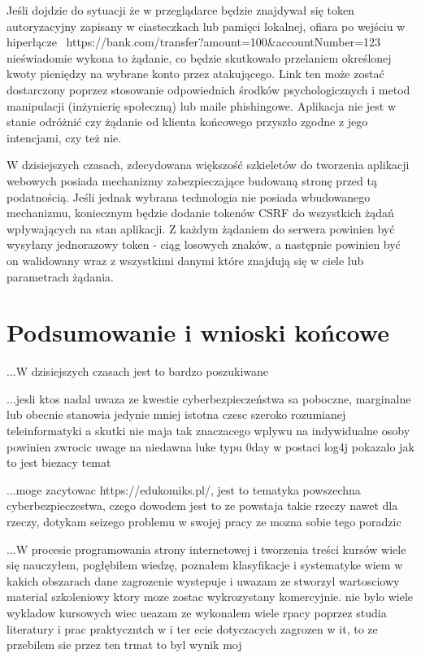 \documentclass[12pt,twoside]{article}
\begin{document}
{Jeśli dojdzie do sytuacji że w przeglądarce będzie znajdywał się token autoryzacyjny zapisany w ciasteczkach lub pamięci lokalnej, ofiara po wejściu  w hiperłącze \
{https://bank.com/transfer?amount=100\&accountNumber=123} nieświadomie wykona to żądanie, co będzie skutkowało przelaniem określonej kwoty pieniędzy na wybrane konto przez atakującego. Link ten może zostać dostarczony poprzez stosowanie odpowiednich środków psychologicznych i metod manipulacji (inżynierię społeczną) lub maile phishingowe. Aplikacja nie jest w stanie odróżnić czy żądanie od klienta końcowego przyszło zgodne z jego intencjami, czy też nie. 

W dzisiejszych czasach, zdecydowana większość szkieletów do tworzenia aplikacji webowych posiada mechanizmy zabezpieczające budowaną stronę przed tą podatnością. Jeśli jednak wybrana technologia nie posiada wbudowanego mechanizmu, koniecznym będzie dodanie tokenów CSRF do wszystkich żądań wpływających na stan aplikacji. Z każdym żądaniem do serwera powinien być wysyłany jednorazowy token - ciąg losowych znaków, a następnie powinien być on walidowany wraz z wszystkimi danymi które znajdują się w ciele lub parametrach żądania. 


\clearpage

\section{Podsumowanie i wnioski końcowe}

...W dzisiejszych czasach jest to bardzo poszukiwane

...jesli ktos nadal uwaza ze kwestie cyberbezpieczeństwa sa poboczne, marginalne lub obecnie stanowia jedynie mniej istotna czesc szeroko rozumianej teleinformatyki a skutki nie maja tak znaczacego wplywu na indywidualne osoby powinien zwrocic uwage na niedawna luke typu 0day w postaci log4j pokazalo jak to jest biezacy temat

...moge zacytowac https://edukomiks.pl/, jest to tematyka powszechna cyberbezpieczestwa, czego dowodem jest to ze powstaja takie rzeczy nawet dla rzeczy, dotykam seizego problemu w swojej pracy ze mozna sobie tego poradzic

...W procesie programowania strony internetowej i tworzenia treści kursów wiele się nauczyłem, pogłębiłem wiedzę, poznałem klasyfikacje i systematyke wiem w kakich obszarach dane zagrozenie wystepuje i uwazam ze stworzyl wartosciowy material szkoleniowy ktory moze zostac wykrozystany komercyjnie. nie bylo wiele wykladow kursowych wiec ueazam ze wykonalem wiele rpacy poprzez studia literatury i prac praktyczntch w i ter ecie dotyczacych zagrozen w it, to ze przebilem sie przez ten trmat to byl wynik moj
\clearpage

}
\end{document}
